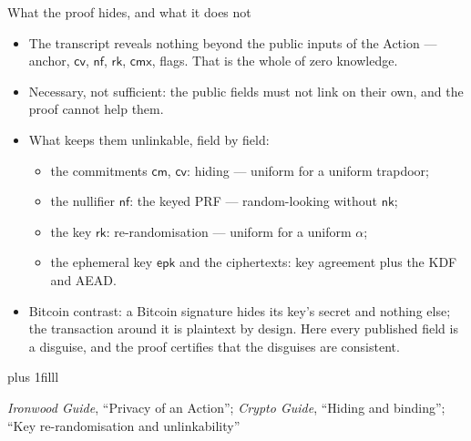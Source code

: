 \documentclass[aspectratio=169,11pt]{beamer}
\newcommand{\nfsym}{\ensuremath{\mathsf{nf}}}
\newcommand{\cmsym}{\ensuremath{\mathsf{cm}}}
\newcommand{\cmx}{\ensuremath{\mathsf{cmx}}}
\newcommand{\cvsym}{\ensuremath{\mathsf{cv}}}
\newcommand{\rksym}{\ensuremath{\mathsf{rk}}}
\newcommand{\nksym}{\ensuremath{\mathsf{nk}}}
\newcommand{\epk}{\ensuremath{\mathsf{epk}}}
\newcommand{\src}[1]{\par\vskip0pt plus 1filll
  {\fontsize{6}{7.2}\selectfont\color{arbdim}\raggedright #1\par}}
\begin{document}
\begin{frame}{What the proof hides, and what it does not}
\begin{itemize}
  \item The transcript reveals nothing beyond the public inputs of the
    Action --- anchor, $\cvsym$, $\nfsym$, $\rksym$, $\cmx$, flags. That
    is the whole of zero knowledge.
  \item Necessary, not sufficient: the public fields must not link on their
    own, and the proof cannot help them.
  \item What keeps them unlinkable, field by field:
    \begin{itemize}
      \item the commitments $\cmsym$, $\cvsym$: hiding --- uniform for a
        uniform trapdoor;
      \item the nullifier $\nfsym$: the keyed PRF --- random-looking
        without $\nksym$;
      \item the key $\rksym$: re-randomisation --- uniform for a uniform
        $\alpha$;
      \item the ephemeral key $\epk$ and the ciphertexts: key agreement
        plus the KDF and AEAD.
    \end{itemize}
  \item Bitcoin contrast: a Bitcoin signature hides its key's secret and
    nothing else; the transaction around it is plaintext by design. Here
    every published field is a disguise, and the proof certifies that the
    disguises are consistent.
\end{itemize}
\src{\emph{Ironwood Guide}, ``Privacy of an Action''; \emph{Crypto Guide},
  ``Hiding and binding''; ``Key re-randomisation and unlinkability''}
\end{frame}
\end{document}
